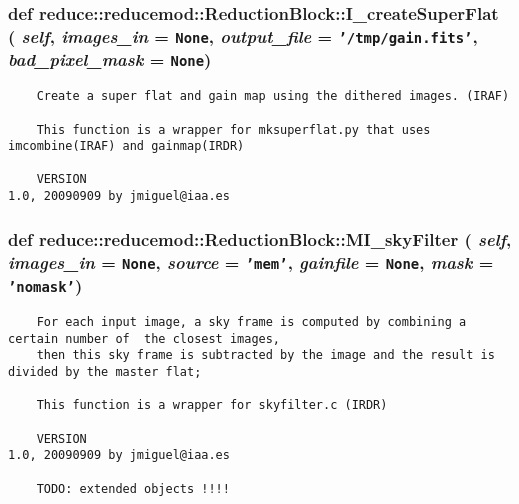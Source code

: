 \subsubsection{\setlength{\rightskip}{0pt plus 5cm}def reduce::reducemod::Reduction\-Block::I\_\-create\-Super\-Flat ( {\em self},  {\em images\_\-in} = {\tt None},  {\em output\_\-file} = {\tt '/tmp/gain.fits'},  {\em bad\_\-pixel\_\-mask} = {\tt None})}\label{classreduce_1_1reducemod_1_1ReductionBlock_4223863cbab649689bd06bb37a41cdcb}




\footnotesize\begin{verbatim}
    Create a super flat and gain map using the dithered images. (IRAF)
         
    This function is a wrapper for mksuperflat.py that uses imcombine(IRAF) and gainmap(IRDR)              

    VERSION
1.0, 20090909 by jmiguel@iaa.es

\end{verbatim}
\normalsize
\subsubsection{\setlength{\rightskip}{0pt plus 5cm}def reduce::reducemod::Reduction\-Block::MI\_\-sky\-Filter ( {\em self},  {\em images\_\-in} = {\tt None},  {\em source} = {\tt 'mem'},  {\em gainfile} = {\tt None},  {\em mask} = {\tt 'nomask'})}\label{classreduce_1_1reducemod_1_1ReductionBlock_ea81d03bad84ab72df77142ee66977ba}




\footnotesize\begin{verbatim}
    For each input image, a sky frame is computed by combining a certain number of  the closest images, 
    then this sky frame is subtracted by the image and the result is divided by the master flat; 
         
    This function is a wrapper for skyfilter.c (IRDR)              

    VERSION
1.0, 20090909 by jmiguel@iaa.es

    TODO: extended objects !!!!
\end{verbatim}
\normalsize

